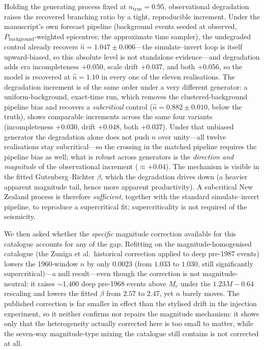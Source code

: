 Holding the generating process fixed at $n_{\mathrm{true}}=0.95$, observational
degradation raises the recovered branching ratio by a tight, reproducible
increment. Under the manuscript's own forecast pipeline (background events seeded
at observed, $P_{\mathrm{background}}$-weighted epicentres; the approximate time
sampler), the undegraded control already recovers
$\hat n=1.047\pm0.006$---the simulate--invert loop is itself upward-biased, so this
absolute level is not standalone evidence---and degradation adds era incompleteness
$+0.050$, scale drift $+0.037$, and both $+0.056$, so the model is recovered at
$\hat n=1.10$ in every one of the eleven realisations. The degradation increment is
of the same order under a very different generator: a uniform-background, exact-time
run, which removes the clustered-background pipeline bias and recovers a
\emph{subcritical} control ($\hat n=0.882\pm0.010$, below the truth), shows
comparable increments across the same four variants (incompleteness $+0.030$, drift
$+0.048$, both $+0.037$). Under that unbiased generator the degradation alone does
not push $n$ over unity---all twelve realisations stay subcritical---so the crossing
in the matched pipeline requires the pipeline bias as well; what is robust across
generators is the \emph{direction and magnitude} of the observational increment
($\approx+0.04$). The mechanism is visible in the fitted Gutenberg--Richter $\beta$,
which the degradation drives down (a heavier apparent magnitude tail, hence more
apparent productivity). A subcritical New Zealand process is therefore
\emph{sufficient}, together with the standard simulate--invert pipeline, to
reproduce a supercritical fit; supercriticality is not required of the seismicity.

We then asked whether the \emph{specific} magnitude correction available for this
catalogue accounts for any of the gap. Refitting on the magnitude-homogenised
catalogue (the Zuniga et al.\ historical correction applied to deep pre-1987
events) lowers the 1960-window $n$ by only $0.0023$ (from $1.033$ to $1.030$,
still significantly supercritical)---a null result---even though the correction is
not magnitude-neutral: it raises $\sim$1{,}400 deep pre-1968 events above $M_c$
under the $1.23M-0.64$ rescaling and lowers the fitted $\beta$ from $2.57$ to
$2.47$, yet $n$ barely moves. The
published correction is far smaller in effect than the stylised drift in the
injection experiment, so it neither confirms nor repairs the magnitude mechanism:
it shows only that the heterogeneity actually corrected here is too small to
matter, while the seven-way magnitude-type mixing the catalogue still contains is
not corrected at all.

